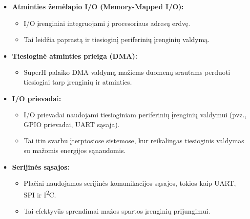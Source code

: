 \documentclass{article}
\begin{document}
\begin{itemize}
    \item \textbf{Atminties žemėlapio I/O (Memory-Mapped I/O):}
        \begin{itemize}
            \item I/O įrenginiai integruojami į procesoriaus adresų erdvę.
            \item Tai leidžia paprastą ir tiesioginį periferinių įrenginių valdymą.
        \end{itemize}
    \item \textbf{Tiesioginė atminties prieiga (DMA):}
        \begin{itemize}
            \item SuperH palaiko DMA valdymą mažiems duomenų srautams perduoti tiesiogiai tarp įrenginių ir atminties.
        \end{itemize}
    \item \textbf{I/O prievadai:}
        \begin{itemize}
            \item I/O prievadai naudojami tiesioginiam periferinių įrenginių valdymui (pvz., GPIO prievadai, UART sąsaja).
            \item Tai itin svarbu įterptosiose sistemose, kur reikalingas tiesioginis valdymas su mažomis energijos sąnaudomis.
        \end{itemize}
    \item \textbf{Serijinės sąsajos:}
        \begin{itemize}
            \item Plačiai naudojamos serijinės komunikacijos sąsajos, tokios kaip UART, SPI ir I\textsuperscript{2}C.
            \item Tai efektyvūs sprendimai mažos spartos įrenginių prijungimui.
        \end{itemize}
\end{itemize}
\end{document}
